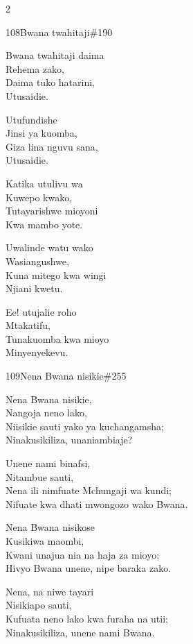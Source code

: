 \documentclass{article}
\begin{document}
\begin{multicols}{2}
\begin{hymn}{108}{Bwana twahitaji}{\#190}
\begin{stanza}
Bwana twahitaji daima\\
Rehema zako,\\
Daima tuko hatarini,\\
Utusaidie.
\end{stanza}
\begin{chorus}
Utufundishe\\
Jinsi ya kuomba,\\
Giza lina nguvu sana,\\
Utusaidie.
\end{chorus}
\begin{stanza}
Katika utulivu wa\\
Kuwepo kwako,\\
Tutayarishwe mioyoni\\
Kwa mambo yote.
\end{stanza}
\begin{stanza}
Uwalinde watu wako\\
Wasiangushwe,\\
Kuna mitego kwa wingi\\
Njiani kwetu.
\end{stanza}
\begin{stanza}
Ee! utujalie roho\\
Mtakatifu,\\
Tunakuomba kwa mioyo\\
Minyenyekevu.
\end{stanza}
\end{hymn}

\begin{hymn}{109}{Nena Bwana nisikie}{\#255}
\begin{stanza}
Nena Bwana nisikie,\\
Nangoja neno lako,\\
Niisikie sauti yako ya kuchangamsha;\\
Ninakusikiliza, unaniambiaje?
\end{stanza}
\begin{stanza}
Unene nami binafsi,\\
Nitambue sauti,\\
Nena ili nimfuate Mchungaji wa kundi;\\
Nifuate kwa dhati mwongozo wako Bwana.
\end{stanza}
\begin{stanza}
Nena Bwana nisikose\\
Kusikiwa maombi,\\
Kwani unajua nia na haja za mioyo;\\
Hivyo Bwana unene, nipe baraka zako.
\end{stanza}
\begin{stanza}
Nena, na niwe tayari\\
Nisikiapo sauti,\\
Kufuata neno lako kwa furaha na utii;\\
Ninakusikiliza, unene nami Bwana.
\end{stanza}
\end{hymn}


\end{multicols}
\end{document}
